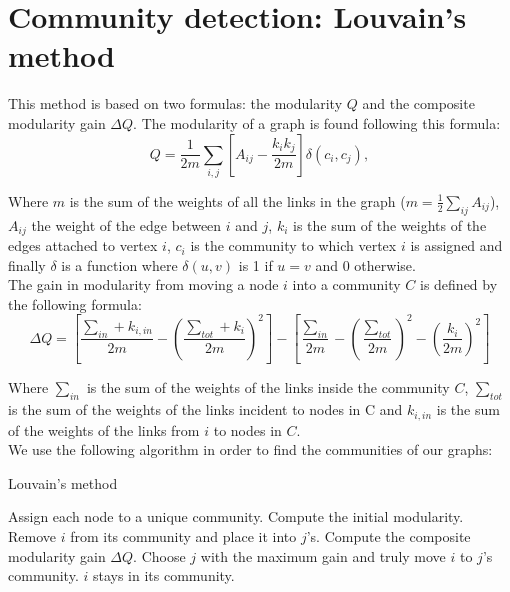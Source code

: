 \documentclass[UTF8, twoside]{EPURapport}
\begin{document}
\chapter{Community detection: Louvain's method}

	\hspace{4ex}This method is based on two formulas: the modularity $Q$ and the composite modularity gain $\Delta Q$. The modularity of a graph is found following this formula:
\\

\[
Q = \frac{1}{2m}\underset{i,j}{\sum}\left[A_{ij} - \frac{k_ik_j}{2m}\right] \delta(c_i,c_j),
\]

	Where $m$ is the sum of the weights of all the links in the graph ($m = \frac{1}{2}\underset{ij}{\sum}A_{ij}$), $A_{ij}$ the weight of the edge between $i$ and $j$, $k_i$ is the sum of the weights of the edges attached to vertex $i$, $c_i$ is the community to which vertex $i$ is assigned and finally $\delta$ is a function where $\delta(u,v)$ is 1 if $u=v$ and 0 otherwise.
\\
	
	The gain in modularity from moving a node $i$ into a community $C$ is defined by the following formula:
\\

\[
\Delta Q = \left[ \frac{\sum_{in}+k_{i,in}}{2m} - \left( \frac{\sum_{tot}+k_i}{2m} \right)^2 \right] -  \left[ \frac{\sum_{in}}{2m} - \left( \frac{\sum_{tot}}{2m} \right)^2 - \left( \frac{k_i}{2m} \right)^2 \right]
\]

	Where $\sum_{in}$ is the sum of the weights of the links inside the community $C$, $\sum_{tot}$ is the sum of the weights of the links incident to nodes in C and $k_{i,in}$ is the sum of the weights of the links from $i$ to nodes in $C$.
\\

	We use the following algorithm in order to find the communities of our graphs:


\begin{algorithm}
  \caption{Louvain's method}
  \begin{algorithmic}[1]
      \State Assign each node to a unique community.
      \State Compute the initial modularity.
      \Repeat
		  	\State Remove $i$ from its community and place it into $j$'s.
		  	\State Compute the composite modularity gain $\Delta Q$.
		  \EndFor
		  	\State Choose $j$ with the maximum gain and truly move $i$ to $j$'s community.
		  \Else
		  	\State $i$ stays in its community.
		  \EndIf
		\EndFor
  \end{algorithmic}
\end{algorithm}
\end{document}
